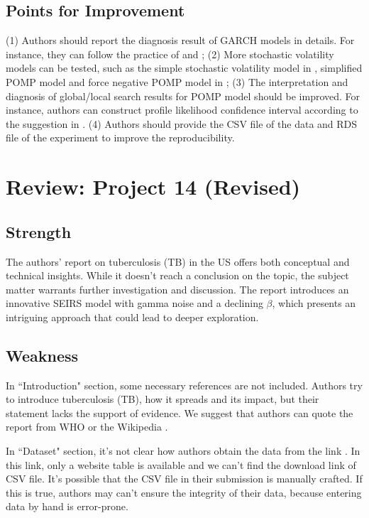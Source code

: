 \documentclass[12pt]{article}
\begin{document}
\subsection{Points for Improvement}

(1) Authors should report the diagnosis result of GARCH models in details. For instance, they can follow the practice of \cite{2022/proj14} and \cite{2022/proj07}; (2) More stochastic volatility models can be tested, such as the simple stochastic volatility model in \cite{2022/proj14}, simplified POMP model and force negative POMP model in \cite{2022/proj22}; (3) The interpretation and diagnosis of global/local search results for POMP model should be improved. For instance, authors can construct profile likelihood confidence interval according to the suggestion in \cite{2024/lec16}. (4) Authors should provide the CSV file of the data and RDS file of the experiment to improve the reproducibility.


\section{Review: Project 14 (Revised)}

\subsection{Strength}

The authors' report on tuberculosis (TB) in the US offers both conceptual and technical insights. While it doesn't reach a conclusion on the topic, the subject matter warrants further investigation and discussion. The report introduces an innovative SEIRS model with gamma noise and a declining $\beta$, which presents an intriguing approach that could lead to deeper exploration.


\subsection{Weakness}

In ``Introduction" section, some necessary references are not included. Authors try to introduce tuberculosis (TB), how it spreads and its impact, but their statement lacks the support of evidence. We suggest that authors can quote the report from WHO \cite{2024/who_tb} or the Wikipedia \cite{2024/wiki_tb}.


In ``Dataset" section, it's not clear how authors obtain the data from the link \cite{2024/cdc_tb}. In this link, only a website table is available and we can't find the download link of CSV file. It's possible that the CSV file in their submission is manually crafted. If this is true, authors may can't ensure the integrity of their data, because entering data by hand is error-prone.
\end{document}

